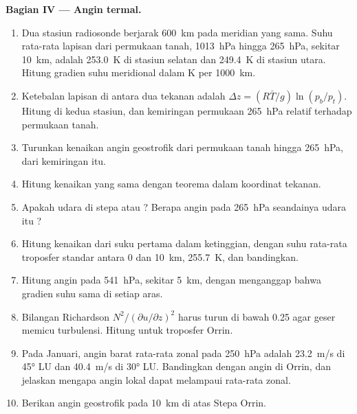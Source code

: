 \begin{problem}
\medskip\noindent\textbf{Bagian IV --- Angin termal.}
\begin{enumerate}[resume]
\item Dua stasiun radiosonde berjarak \qty{600}{km} pada
  meridian yang sama. Suhu rata-rata lapisan dari permukaan tanah,
  \qty{1013}{hPa} hingga \qty{265}{hPa}, sekitar \qty{10}{km}, adalah \qty{253.0}{K}
  di stasiun selatan dan \qty{249.4}{K} di stasiun utara. Hitung
  gradien suhu meridional dalam \unit{K} per \qty{1000}{km}.
\item Ketebalan lapisan di antara dua tekanan adalah $\Delta z = (R\bar
  T/g)\ln(p_b/p_t)$. Hitung di kedua stasiun, dan kemiringan permukaan
  \qty{265}{hPa} relatif terhadap permukaan tanah.
\item Turunkan kenaikan angin geostrofik dari permukaan tanah hingga
  \qty{265}{hPa}, dari kemiringan itu.
\item Hitung kenaikan yang sama dengan teorema  dalam koordinat tekanan.
\item Apakah udara di stepa  atau ? Berapa angin
  pada \qty{265}{hPa} seandainya udara itu ?
\item Hitung kenaikan dari suku pertama  dalam
  ketinggian, dengan suhu rata-rata troposfer standar antara 0
  dan \qty{10}{km}, \qty{255.7}{K}, dan bandingkan.
\item Hitung angin pada \qty{541}{hPa}, sekitar \qty{5}{km}, dengan menganggap bahwa
  gradien suhu sama di setiap aras.
\item Bilangan Richardson $N^2/(\partial u/\partial z)^2$ harus turun di bawah
  0.25 agar geser memicu turbulensi. Hitung untuk troposfer
  Orrin.
\item Pada Januari, angin barat rata-rata zonal pada \qty{250}{hPa} adalah \qty{23.2}{m/s}
  di \ang{45} LU dan \qty{40.4}{m/s} di \ang{30} LU. Bandingkan dengan angin di
  Orrin, dan jelaskan mengapa angin lokal dapat melampaui rata-rata zonal.
\item Berikan angin geostrofik pada \qty{10}{km} di atas Stepa Orrin.
\end{enumerate}
\end{problem}
